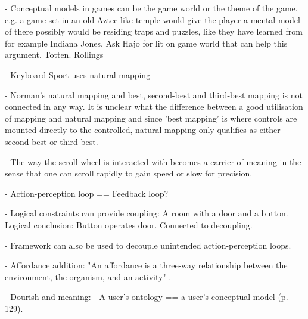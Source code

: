 - Conceptual models in games can be the game world or the theme of the game. e.g. a game set in an old Aztec-like temple would give the player a mental model of there possibly would be residing traps and puzzles, like they have learned from for example Indiana Jones. Ask Hajo for lit on game world that can
help this argument. Totten. Rollings

- Keyboard Sport uses natural mapping

- Norman's natural mapping and best, second-best and third-best mapping is not connected in any way. It is unclear what the difference between a good utilisation of mapping and natural mapping and since 'best mapping' is where controls are mounted directly to the controlled, natural mapping only qualifies as either second-best or third-best.

- The way the scroll wheel is interacted with becomes a carrier of meaning in the sense that one can scroll rapidly to gain speed or slow for precision.

- Action-perception loop == Feedback loop?

- Logical constraints can provide coupling: A room with a door and a button. Logical conclusion: Button operates door. Connected to decoupling.

- Framework can also be used to decouple unintended action-perception loops.

 - Affordance addition: "An affordance is a three-way relationship between the environment, the organism, and an activity" \cite[p. 118]{dourish}.

 - Dourish and meaning:
  - A user's ontology == a user's conceptual model (p. 129).
